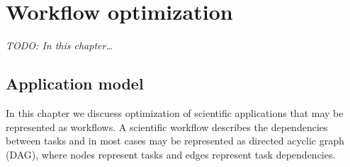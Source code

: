 { %


\newcommand{\INSTANCE}{I}
\newcommand{\STORAGE}{S}
\newcommand{\PROVIDER}{P}
\newcommand{\PROVIDERINSTANCES}{PI}
\newcommand{\LOCALSTORAGE}{LS}

\newcommand{\LAYER}{L}
\newcommand{\TASK}{G}


\newcommand{\instancePrice}{p^I}
\newcommand{\ccu}{ccu}
\newcommand{\instanceTransferPriceIn}{p^{Iin}}
\newcommand{\instanceTransferPriceOut}{p^{Iout}}
\newcommand{\storageTransferPriceOut}{p^{Sout}}
\newcommand{\storageTransferPriceIn}{p^{Sin}}
\newcommand{\transferRate}{r}


\newcommand{\taskCount}{A^{tot}}
\newcommand{\transferTime}{t^{net}}
\newcommand{\execTime}{t^x}
\newcommand{\dataSizeIn}{d^{in}}
\newcommand{\dataSizeOut}{d^{out}}
\newcommand{\requestPrice}{p^{R}}
\newcommand{\workflowDeadline}{t^D}
\newcommand{\instanceDeadline}{t^d}
\newcommand{\unitTime}{t^u}
\newcommand{\transferCost}{c^T}
\newcommand{\tasksPerDeadline}{a^d}
\newcommand{\timeQuantum}{t^q}
\newcommand{\tasksPerTimeQuantum}{a^q}
\newcommand{\providerMaxMachines}{n^{Pmax}}
\newcommand{\instanceMaxMachines}{n^{Imax}}

\newcommand{\NumberInstances}{N}
\newcommand{\TaskAssignment}{A}
\newcommand{\DataAssignment}{D}
\newcommand{\TailTaskHours}{R}
\newcommand{\HasTail}{H}

\newcommand{\instanceSet}{I^{idx}}
\newcommand{\InstanceTasks}{T}
\newcommand{\InstanceHours}{H}
\newcommand{\InstanceActive}{A}           
\newcommand{\LayerDeadline}{D}
\newcommand{\LayerTime}{D^t}

\chapter{Workflow optimization}
\label{chap:formulation-workflows} 

    \emph{TODO: In this chapter…}
  
    \section{Application model}
    \label{sec:workflow:appmodel}
    
    In this chapter we discuess optimization of scientific applications that may be represented as workflows. A scientific workflow describes the dependencies between tasks and in most cases may be represented as directed acyclic graph (DAG), where nodes represent tasks and edges represent task dependencies.
    
}
